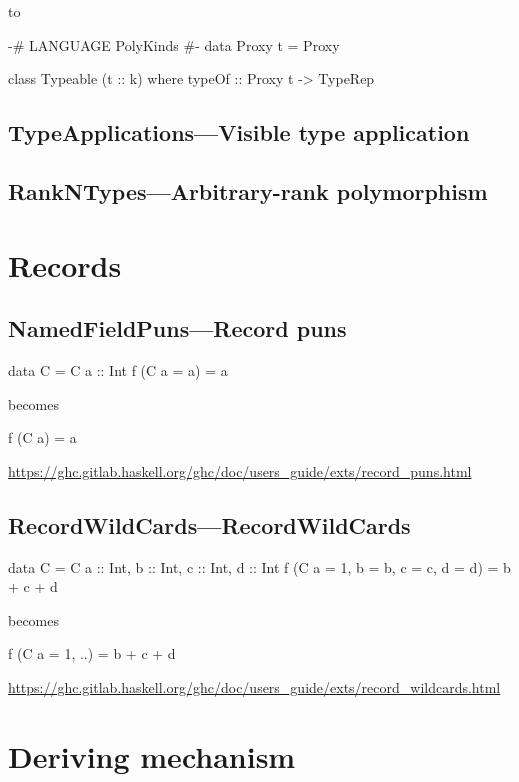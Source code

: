 \documentclass[openany, 12pt]{book}
\begin{document}
to
\begin{haskell}{}
{-# LANGUAGE PolyKinds #-}
data Proxy t = Proxy

class Typeable (t :: k) where
    typeOf :: Proxy t -> TypeRep
\end{haskell}

\setcounter{chapter}{16}
\chapter{TypeApplications---Visible type application}

\setcounter{chapter}{19}
\chapter{RankNTypes---Arbitrary-rank polymorphism}


\part{Records}

\setcounter{chapter}{6}
\chapter{NamedFieldPuns---Record puns}
\begin{haskell}{}
data C = C {a :: Int}
f (C {a = a}) = a
\end{haskell}
becomes

\begin{haskell}{}
f (C {a}) = a
\end{haskell}

\url{https://ghc.gitlab.haskell.org/ghc/doc/users_guide/exts/record_puns.html}

\chapter{RecordWildCards---RecordWildCards}
\begin{haskell}{}
data C = C {a :: Int, b :: Int, c :: Int, d :: Int}
f (C {a = 1, b = b, c = c, d = d}) = b + c + d
\end{haskell}
becomes

\begin{haskell}{}
f (C {a = 1, ..}) = b + c + d
\end{haskell}
\url{https://ghc.gitlab.haskell.org/ghc/doc/users_guide/exts/record_wildcards.html}


\part{Deriving mechanism}
\setcounter{chapter}{4}
\end{document}
